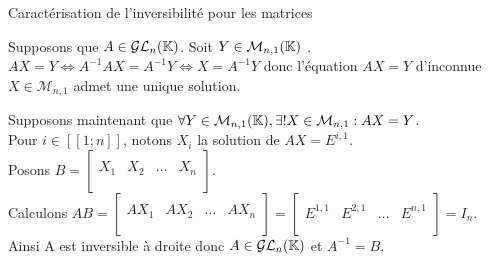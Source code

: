 \documentclass{article}
\renewenvironment{question_kholle}[2][ ]
{
	\subsection{\texorpdfstring{#2}{}}
	\notblank{#1}
	{
		\noindent #1
		\bigbreak
	}
	{}
	\begin{proof}
}
{
	\end{proof}
}
\begin{document}
\begin{question_kholle}
  [$A \in \mathcal{M}_n(\K)$ est inversible si et seulement si pour tout $Y \in \mathcal{M}_{n,1}(\K)$, l'équation $AX = Y$ d'inconnue $X \in \mathcal{M}_{n,1}$ admet une unique solution.
    \begin{equation}
      \forall A \mathcal{M}_n(\K),
      A \in \mathcal{GL}_n(\K) \iff
      \forall Y \in \mathcal{M}_{n,1}(\K), \exists ! X \in \mathcal{M}_{n,1} : AX = Y
    \end{equation}]
  {Caractérisation de l'inversibilité pour les matrices}

  Supposons que $A \in \mathcal{GL}_n(\mathbb K)$.
  Soit $Y \in \mathcal{M}_{n,1}(\K)$ \fq. \\
  $AX = Y \iff A^{-1}AX = A^{-1}Y \iff X = A^{-1}Y$ donc l'équation $AX = Y$ d'inconnue $X \in \mathcal{M}_{n,1}$ admet une unique solution.

  Supposons maintenant que $\forall Y \in \mathcal{M}_{n,1}(\mathbb K), \exists ! X \in \mathcal{M}_{n,1} : AX = Y$. \\
  Pour $i \in [\![1;n]\!]$, notons  $X_i$ la solution de $AX = E^{i,1}$. \\
  Posons $\displaystyle B = \left[ \begin{array}{c|c|c|c}
            &     &        &     \\
        X_1 & X_2 & \ldots & X_n \\
            &     &        &     \\
      \end{array} \right]$. \\
  Calculons $\displaystyle AB
    = \left[ \begin{array}{c|c|c|c}
             &      &        &      \\
        AX_1 & AX_2 & \ldots & AX_n \\
             &      &        &      \\
      \end{array} \right]
    = \left[ \begin{array}{c|c|c|c}
                &         &        &         \\
        E^{1,1} & E^{2,1} & \ldots & E^{n,1} \\
                &         &        &         \\
      \end{array} \right]
    = I_n$. \\
  Ainsi A est inversible à droite donc $A \in \mathcal{GL}_n(\mathbb K)$ et $A^{-1} = B$.
\end{question_kholle}
\end{document}
